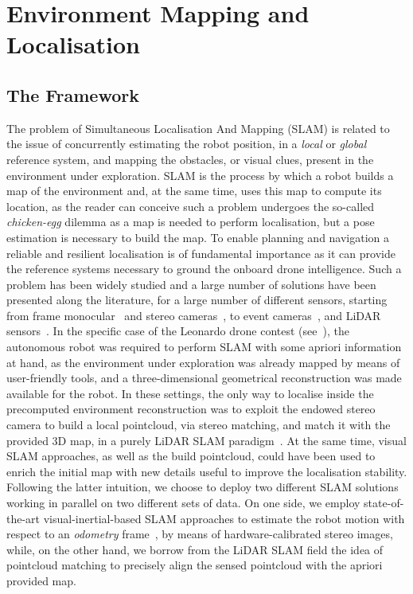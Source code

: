\chapter{Environment Mapping and Localisation}%
\label{CH:MAPPING}

\section{The Framework}%
\label{SEC:MANDL-FRAMEWORK}
The problem of Simultaneous Localisation And Mapping (SLAM) is related to the issue of concurrently estimating the robot position, in a
\emph{local} or \emph{global} reference system, and mapping the obstacles, or visual clues, present in the environment under exploration.
SLAM is the process by which a robot builds a map of the environment and, at the same time, uses this map to compute its location,
as the reader can conceive such a problem undergoes the so-called \emph{chicken-egg} dilemma as a map is needed to perform localisation,
but a pose estimation is necessary to build the map. To enable planning and navigation a reliable and resilient localisation is of fundamental
importance as it can provide the reference systems necessary to ground the onboard drone intelligence.
Such a problem has been widely studied and a large number of solutions have been presented along
the literature, for a large number of different sensors, starting from frame monocular~\cite{forster2014svo, mur2015orb, qin2018vins} and
stereo cameras~\cite{gomez2019pl, mur2017orb, campos2021orb}, to event cameras~\cite{vidal2018ultimate},
and LiDAR sensors~\cite{zhang2014loam, xu2021fast, xu2022fast, kim2021scan, caballero2021dll}.
In the specific case of the Leonardo drone contest (see~), the autonomous robot was required to perform SLAM with some apriori information at hand,
as the environment under exploration was already mapped by means of user-friendly tools, and a three-dimensional geometrical reconstruction was
made available for the robot. In these settings, the only way to localise inside the precomputed environment reconstruction was to exploit the
endowed stereo camera to build a local pointcloud, via stereo matching, and match it with the provided 3D map, in a purely LiDAR SLAM
paradigm~\cite{zhang2014loam, xu2021fast, xu2022fast, kim2021scan, caballero2021dll}.
At the same time, visual SLAM approaches, as well as the build pointcloud, could have been used to enrich the initial map with new
details useful to improve the localisation stability.
Following the latter intuition, we choose to deploy two different SLAM solutions working in parallel on two different sets of data.
On one side, we employ state-of-the-art visual-inertial-based SLAM approaches to estimate the robot motion with respect to an \emph{odometry}
frame~\cite{mur2015orb, qin2018vins}, by means of hardware-calibrated stereo images, while, on the other hand, we borrow from the LiDAR
SLAM field the idea of pointcloud matching to precisely align the sensed pointcloud with the apriori provided map.


